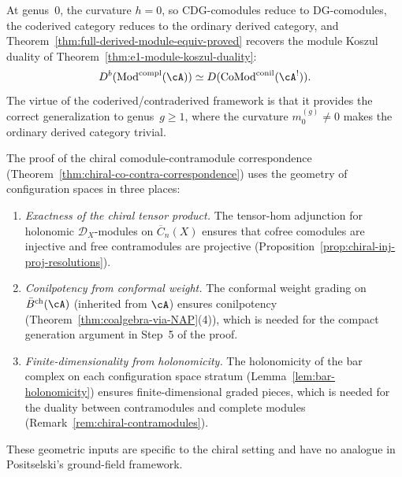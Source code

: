 \begin{remark}
\label{rem:genus-0-recovery}
At genus~$0$, the curvature $h = 0$, so CDG-comodules reduce to
DG-comodules, the coderived category reduces to the ordinary derived
category, and Theorem~\ref{thm:full-derived-module-equiv-proved}
recovers the module Koszul duality of
Theorem~\ref{thm:e1-module-koszul-duality}:
\[
D^b(\mathrm{Mod}^{\mathrm{compl}}(\cA))
\simeq D(\mathrm{CoMod}^{\mathrm{conil}}(\cA^!)).
\]
The virtue of the coderived/contraderived framework is that it
provides the correct generalization to genus~$g \geq 1$, where the
curvature $m_0^{(g)} \neq 0$ makes the ordinary derived category
trivial.
\end{remark}

\begin{remark}
\label{rem:config-space-role}
The proof of the chiral comodule-contramodule correspondence
(Theorem~\ref{thm:chiral-co-contra-correspondence}) uses the
geometry of configuration spaces in three places:
\begin{enumerate}
\item \emph{Exactness of the chiral tensor product.}
  The tensor-hom adjunction for holonomic $\mathcal{D}_X$-modules
  on $\overline{C}_n(X)$ ensures that cofree comodules are injective
  and free contramodules are projective
  (Proposition~\ref{prop:chiral-inj-proj-resolutions}).
\item \emph{Conilpotency from conformal weight.}
  The conformal weight grading on $\bar{B}^{\mathrm{ch}}(\cA)$
  (inherited from $\cA$) ensures conilpotency
  (Theorem~\ref{thm:coalgebra-via-NAP}(4)), which is needed for
  the compact generation argument in Step~5 of the proof.
\item \emph{Finite-dimensionality from holonomicity.}
  The holonomicity of the bar complex on each configuration space
  stratum (Lemma~\ref{lem:bar-holonomicity}) ensures
  finite-dimensional graded pieces, which is
  needed for the duality between contramodules and complete modules
  (Remark~\ref{rem:chiral-contramodules}).
\end{enumerate}
These geometric inputs are specific to the chiral setting and have
no analogue in Positselski's ground-field framework.
\end{remark}


